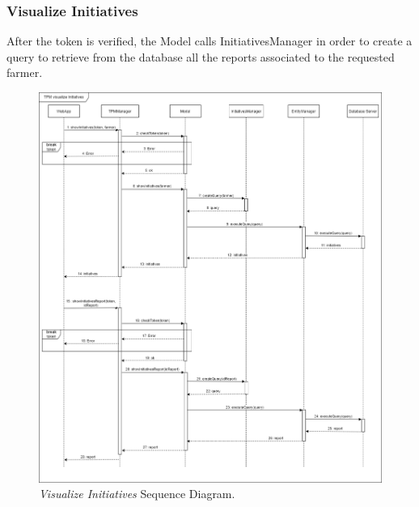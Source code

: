 \subsubsection{Visualize Initiatives}
After the token is verified, the Model calls InitiativesManager in order to create a query to retrieve from the database all the reports associated to the requested farmer.
\begin{figure}[H]
    \centering
    \includegraphics[width=\textwidth]{Images/Sequence Diagram/TPMVisualizeInitiatives.png}
    \caption{\textit{Visualize Initiatives} Sequence Diagram.}
\end{figure}
\newpage
